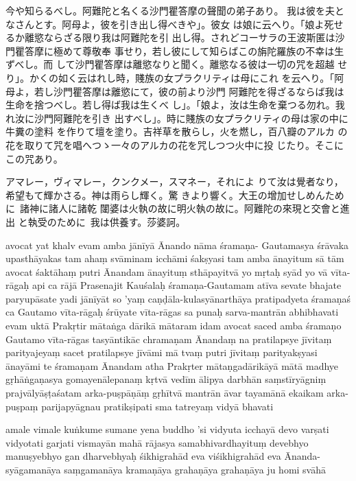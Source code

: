 \newpage
\noindent
今や知らるべし。阿難陀と名くる沙門瞿答摩の聲聞の弟子あり。
我は彼を夫となさんとす。阿母よ，彼を引き出し得べきや」。彼女
は娘に云へり。「娘よ死せるか離慾ならざる限り我は阿難陀を引
出し得。されどコーサラの王波斯匿は沙門瞿答摩に極めて尊敬奉
事せり，若し彼にして知らばこの旃陀羅族の不幸は生ずべし。而
して沙門瞿答摩は離慾なりと聞く。離慾なる彼は一切の咒を超越
せり」。かくの如く云はれし時，賤族の女プラクリティは母にこれ
を云へり。「阿母よ，若し沙門瞿答摩は離慾にて，彼の前より沙門
阿難陀を得ざるならば我は生命を捨つべし。若し得ば我は生くべ
し」。「娘よ，汝は生命を棄つる勿れ。我れ汝に沙門阿難陀を引き
出すべし」。時に賤族の女プラクリティの母は家の中に牛糞の塗料
を作りて壇を塗り。吉祥草を散らし，火を燃し，百八瓣のアルカ
の花を取りて咒を唱へつゝ一々のアルカの花を咒しつつ火中に投
じたり。そこにこの咒あり。
\begin{addmargin}[2em]{0em}
\indent
アマレー，ヴィマレー，クンクメー，スマネー，それによ
りて汝は覺者なり，希望もて輝かさる。神は雨らし輝く。驚
きより響く。大王の增加せしめんために\ 諸神に諸人に諸乾
闥婆は火執の故に明火執の故に。阿難陀の來現と交會と進出
と執受のために\ 我は供養す。莎婆訶。
\end{addmargin}

\newpage
avocat \da{} yat khalv evam amba jānīyā Ānando nāma śramaṇa-
Gautamasya śrāvaka upasthāyakas tam ahaṃ svāminam
icchāmi śakṣyasi tam amba ānayitum \da{} sā tām avocat \da{}
śaktāhaṃ putri Ānandam ānayituṃ sthāpayitvā yo mṛtaḥ
syād yo vā vīta-rāgaḥ \da{} api ca rājā Prasenajit Kauśalaḥ
śramaṇa-Gautamam atīva sevate bhajate paryupāsate \da{} yadi
jānīyāt so 'yaṃ caṇḍāla-kulasyānarthāya pratipadyeta \da{}
śramaṇaś ca Gautamo vīta-rāgaḥ śrūyate vīta-rāgas sa punaḥ
sarva-mantrān abhibhavati \da{} evam uktā Prakṛtir mātaṅga\-%
dārikā mātaram idam avocat \da{} saced amba śramaṇo Gautamo
vīta-rāgas tasyāntikāc chramaṇam Ānandaṃ na pratilapsye
jīvitaṃ parityajeyaṃ sacet pratilapsye jīvāmi \da{} mā tvaṃ
putri jīvitaṃ parityakṣyasi ānayāmi te śramaṇam Ānandam \da{}
atha Prakṛter mātaṇgadārikāyā mātā madhye gṛhāṅgaṇasya
gomayenālepanaṃ kṛtvā vedīm ālipya darbhān saṃstīryāgniṃ
prajvālyāṣṭaśatam arka-puṣpāṇāṃ gṛhītvā mantrān āvar\-%
tayamānā ekaikam arka-puṣpaṃ parijapyāgnau pratikṣipati
sma \da{} tatreyaṃ vidyā bhavati \da{}
\begin{addmargin}[2em]{0em}
\indent
amale vimale kuṅkume sumane yena buddho 'si vidyuta
icchayā devo varṣati vidyotati garjati vismayān mahā\-%
rājasya samabhivardhayituṃ devebhyo manuṣyebhyo gan\-%
dharvebhyaḥ śikhigrahād eva viśikhigrahād eva Ānanda-
syāgamanāya saṃgamanāya kramaṇāya grahaṇāya grahaṇāya ju\-%
homi svāhā \dd
\end{addmargin}

